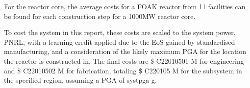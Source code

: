 For the reactor core, the average costs for a FOAK reactor from 11 facilities can be found for each construction step for a 1000MW reactor core.

To cost the system in this report, these costs are scaled to the system power, PNRL, with a learning credit applied due to the EoS gained by standardised manufacturing, and a consideration of the likely maximum PGA for the location the reactor is constructed in. The final costs are \$ C22010501 M for engineering and \$ C22010502 M for fabrication, totaling \$ C220105 M for the subsystem in the specified region, assuming a PGA of systpga g.
